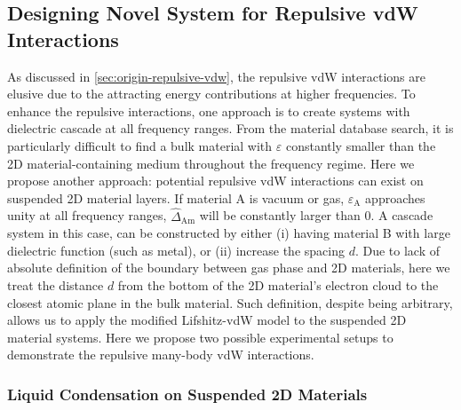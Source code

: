 \subsection{Designing Novel System for Repulsive vdW Interactions}
\label{sec:proposing-new-system}

As discussed in \autoref{sec:origin-repulsive-vdw}, the repulsive vdW
interactions are elusive due to the attracting energy contributions
at higher frequencies.
%
To enhance the repulsive interactions, one approach is to create systems with dielectric cascade at all frequency ranges.
%
From the material database search, it is particularly difficult to
find a bulk material with $\varepsilon$ constantly smaller than the 2D
material-containing medium throughout the frequency
regime. 
Here we propose another approach: potential repulsive vdW interactions
can exist on suspended 2D material layers. If material A is vacuum or
gas, $\varepsilon_{\mathrm{A}}$ approaches unity at all frequency
ranges, $\hat{\Delta}_{\mathrm{Am}}$ will be constantly larger than
0. A cascade system in this case, can be constructed by either (i)
having material B with large dielectric function (such as metal), or
(ii) increase the spacing $d$.
%
 Due to lack of absolute definition of the
boundary between gas phase and 2D materials, here we treat the
distance $d$ from the bottom of the 2D material's electron cloud to
the closest atomic plane in the bulk material.
%
Such definition, despite being arbitrary, 
allows us to apply the modified Lifshitz-vdW model to the suspended 2D
material systems.
%
Here we propose two possible experimental setups to demonstrate the repulsive many-body vdW interactions.

\subsubsection{Liquid Condensation on Suspended 2D Materials}
\label{sec:liqu-cond-susp}

